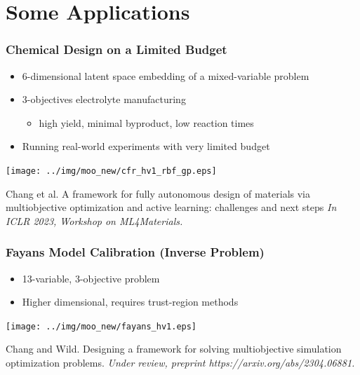 \documentclass[aspectratio=169]{beamer}
\begin{document}
\section{Some Applications}

\begin{frame}
\frametitle{Chemical Design on a Limited Budget}

{\small
\begin{itemize}
\item 6-dimensional latent space embedding of a mixed-variable problem
\item 3-objectives electrolyte manufacturing
\begin{itemize}
\item high yield, minimal byproduct, low reaction times
\end{itemize}
\item Running real-world experiments with very limited budget
\end{itemize}
}

\begin{center}
\texttt{[image: ../img/moo\_new/cfr\_hv1\_rbf\_gp.eps]}
\end{center}

\vfill

{\tiny

Chang et al.
A framework for fully autonomous design of materials via multiobjective optimization and active learning: challenges and next steps
{\sl In ICLR 2023, Workshop on ML4Materials.}

}

\end{frame}

\begin{frame}
\frametitle{Fayans Model Calibration (Inverse Problem)}

\begin{itemize}
\item 13-variable, 3-objective problem
\item Higher dimensional, requires trust-region methods
\end{itemize}

\begin{center}
\texttt{[image: ../img/moo\_new/fayans\_hv1.eps]}
\end{center}

\vfill

{\tiny

Chang and Wild.
Designing a framework for solving multiobjective simulation optimization problems.
{\sl Under review, preprint https://arxiv.org/abs/2304.06881.}

}

\end{frame}
\end{document}
